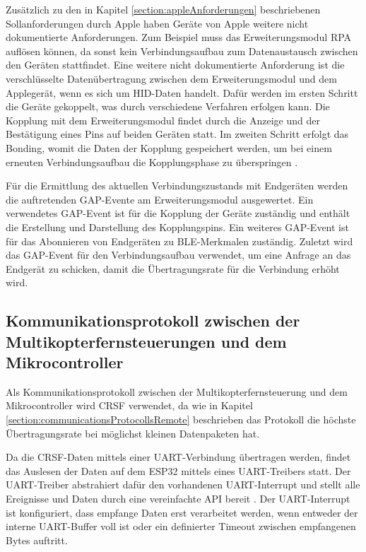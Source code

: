 Zusätzlich zu den in Kapitel \ref{section:appleAnforderungen} beschriebenen Sollanforderungen durch Apple haben Geräte von Apple weitere nicht dokumentierte Anforderungen. Zum Beispiel muss das Erweiterungsmodul \ac{RPA} auflösen können, da sonst kein Verbindungsaufbau zum Datenaustausch zwischen den Geräten stattfindet. Eine weitere nicht dokumentierte Anforderung ist die verschlüsselte Datenübertragung zwischen dem Erweiterungsmodul und dem Applegerät, wenn es sich um \ac{HID}-Daten handelt. Dafür werden im ersten Schritt die Geräte gekoppelt, was durch verschiedene Verfahren erfolgen kann. Die Kopplung mit dem Erweiterungsmodul findet durch die Anzeige und der Bestätigung eines Pins auf beiden Geräten statt. Im zweiten Schritt erfolgt das Bonding, womit die Daten der Kopplung gespeichert werden, um bei einem erneuten Verbindungsaufbau die Kopplungsphase zu überspringen \cite{kyneticsBondingPairng}.

Für die Ermittlung des aktuellen Verbindungszustands mit Endgeräten werden die auftretenden \ac{GAP}-Evente am Erweiterungsmodul ausgewertet. Ein verwendetes \ac{GAP}-Event ist für die Kopplung der Geräte zuständig und enthält die Erstellung und Darstellung des Kopplungspins. Ein weiteres \ac{GAP}-Event ist für das Abonnieren von Endgeräten zu \ac{BLE}-Merkmalen zuständig. Zuletzt wird das \ac{GAP}-Event für den Verbindungsaufbau verwendet, um eine Anfrage an das Endgerät zu schicken, damit die Übertragungsrate für die Verbindung erhöht wird.

\subsection{Kommunikationsprotokoll zwischen der Multikopterfernsteuerungen und dem Mikrocontroller}
\label{section:communicationCRSF}
Als Kommunikationsprotokoll zwischen der Multikopterfernsteuerung und dem Mikrocontroller wird CRSF verwendet, da wie in Kapitel \ref{section:communicationsProtocollsRemote} beschrieben das Protokoll die höchste Übertragungsrate bei möglichst kleinen Datenpaketen hat.

Da die CRSF-Daten mittels einer \ac{UART}-Verbindung übertragen werden, findet das Auslesen der Daten auf dem ESP32 mittels eines \ac{UART}-Treibers statt. Der \ac{UART}-Treiber abstrahiert dafür den vorhandenen \ac{UART}-Interrupt und stellt alle Ereignisse und Daten durch eine vereinfachte \ac{API} bereit \cite{espUARTDriver}. Der \ac{UART}-Interrupt ist konfiguriert, dass empfange Daten erst verarbeitet werden, wenn entweder der interne \ac{UART}-Buffer voll ist oder ein definierter Timeout zwischen empfangenen Bytes auftritt.


